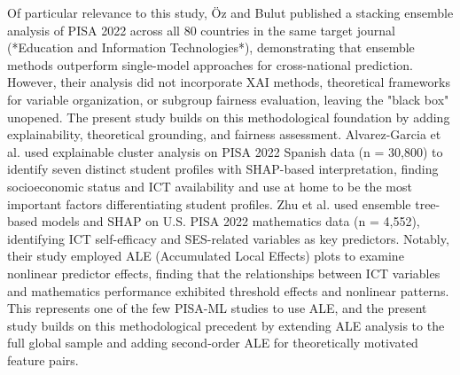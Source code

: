 \documentclass[pdflatex,sn-mathphys-ay]{sn-jnl}
\begin{document}
Of particular relevance to this study, Öz and Bulut \citep{Oz_Bulut_2025_stacking} published a stacking ensemble analysis of PISA 2022 across all 80 countries in the same target journal (*Education and Information Technologies*), demonstrating that ensemble methods outperform single-model approaches for cross-national prediction. However, their analysis did not incorporate XAI methods, theoretical frameworks for variable organization, or subgroup fairness evaluation, leaving the "black box" unopened. The present study builds on this methodological foundation by adding explainability, theoretical grounding, and fairness assessment. Alvarez-Garcia et al. \citep{Gomez_Talal_2024_clusters} used explainable cluster analysis on PISA 2022 Spanish data (n = 30,800) to identify seven distinct student profiles with SHAP-based interpretation, finding socioeconomic status and ICT availability and use at home to be the most important factors differentiating student profiles. Zhu et al. \citep{Zhu_2025_US_PISA} used ensemble tree-based models and SHAP on U.S. PISA 2022 mathematics data (n = 4,552), identifying ICT self-efficacy and SES-related variables as key predictors. Notably, their study employed ALE (Accumulated Local Effects) plots to examine nonlinear predictor effects, finding that the relationships between ICT variables and mathematics performance exhibited threshold effects and nonlinear patterns. This represents one of the few PISA-ML studies to use ALE, and the present study builds on this methodological precedent by extending ALE analysis to the full global sample and adding second-order ALE for theoretically motivated feature pairs.
\end{document}
